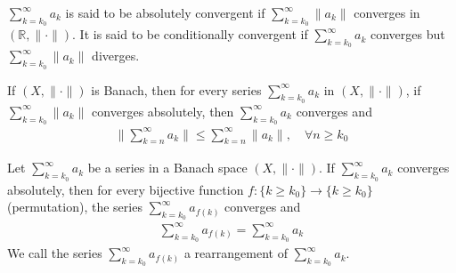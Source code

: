 \documentclass{tufte-handout}
\begin{document}
\begin{Definition}
    \(\sum_{k=k_0}^{\infty}a_k\) is said to be absolutely convergent if 
    \(\sum_{k=k_0}^{\infty}\|a_k\|\) converges in \((\mathbb{R}, \|\cdot\|)\).
    It is said to be conditionally convergent if \(\sum_{k=k_0}^{\infty}a_k\) converges but 
    \(\sum_{k=k_0}^{\infty}\|a_k\|\) diverges.
\end{Definition}

\begin{Proposition}
    If \((X, \|\cdot\|)\) is Banach, then for every series 
    \(\sum_{k=k_0}^{\infty}a_k\) in \( (X, \|\cdot\|) \), 
    if \(\sum_{k=k_0}^{\infty}\|a_k\|\) converges absolutely,
    then \(\sum_{k=k_0}^{\infty}a_k\) converges and
    \begin{align}
        \|\sum_{k=n}^{\infty}a_k\| \leq \sum_{k=n}^{\infty}\|a_k\|, \quad \forall n \geq k_0
    \end{align}
\end{Proposition}



\begin{Proposition}
    Let \( 
    \sum_{k=k_0}^{\infty}a_k \) be a series in a Banach space \( (X, \|\cdot\|) \).
    If \(\sum_{k=k_0}^{\infty}a_k\) converges absolutely, then for every bijective function 
    \(f: \{k \geq k_0\} \to \{k \geq k_0\}\) (permutation), 
    the series \(\sum_{k=k_0}^{\infty}a_{f(k)}\) converges and
    \begin{align}
        \sum_{k=k_0}^{\infty}a_{f(k)} = \sum_{k=k_0}^{\infty}a_k
    \end{align}
    We call the series \( \sum_{k=k_0}^{\infty}a_{f(k)} \) a rearrangement of \( \sum_{k=k_0}^{\infty}a_k \).
\end{Proposition}
\end{document}
